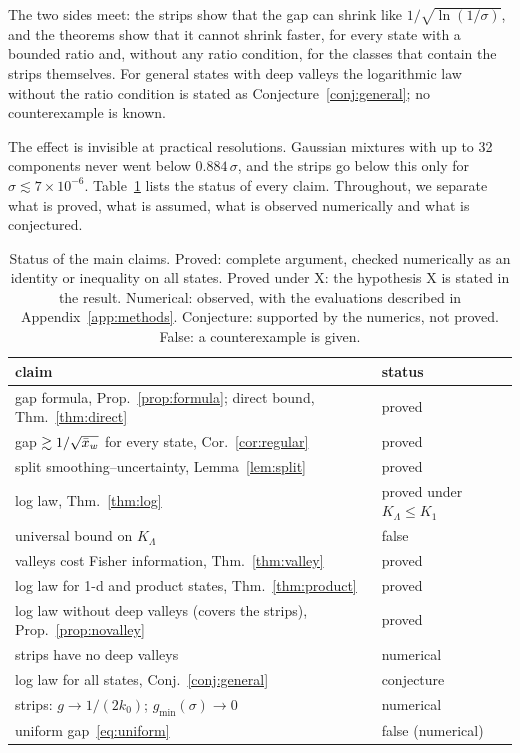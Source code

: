 The two sides meet: the strips show that the gap can shrink like $1/\sqrt{\ln(1/\sigma)}$, and the theorems show that it cannot shrink faster, for every state with a bounded ratio and, without any ratio condition, for the classes that contain the strips themselves. For general states with deep valleys the logarithmic law without the ratio condition is stated as Conjecture~\ref{conj:general}; no counterexample is known.

The effect is invisible at practical resolutions. Gaussian mixtures with up to 32 components never went below $0.884\,\sigma$, and the strips go below this only for $\sigma \lesssim 7\times 10^{-6}$. Table~\ref{tab:status} lists the status of every claim. Throughout, we separate what is proved, what is assumed, what is observed numerically and what is conjectured.

\begin{table}[t]
\caption{Status of the main claims. Proved: complete argument, checked numerically as an identity or inequality on all states. Proved under X: the hypothesis X is stated in the result. Numerical: observed, with the evaluations described in Appendix~\ref{app:methods}. Conjecture: supported by the numerics, not proved. False: a counterexample is given.}
\label{tab:status}
\begin{ruledtabular}
\footnotesize
\begin{tabular}{@{}p{}l@{}}
claim & status \\
\hline
gap formula, Prop.~\ref{prop:formula}; direct bound, Thm.~\ref{thm:direct} & proved \\
gap $\gtrsim 1/\sqrt{\bar{x}_w}$ for every state, Cor.~\ref{cor:regular} & proved \\
split smoothing--uncertainty, Lemma~\ref{lem:split} & proved \\
log law, Thm.~\ref{thm:log} & proved under $K_\Lambda \leq K_1$ \\
universal bound on $K_\Lambda$ & false \\
valleys cost Fisher information, Thm.~\ref{thm:valley} & proved \\
log law for 1-d and product states, Thm.~\ref{thm:product} & proved \\
log law without deep valleys (covers the strips), Prop.~\ref{prop:novalley} & proved \\
strips have no deep valleys & numerical \\
log law for all states, Conj.~\ref{conj:general} & conjecture \\
strips: $g \to 1/(2k_0)$; $g_{\min}(\sigma) \to 0$ & numerical \\
uniform gap~\eqref{eq:uniform} & false (numerical) \\
\end{tabular}
\end{ruledtabular}
\end{table}
